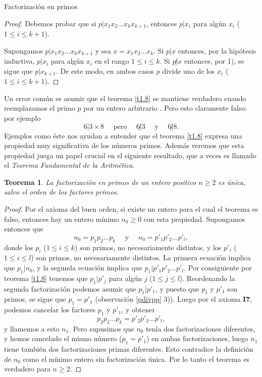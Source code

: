 \documentclass[11pt,spanish,makeidx]{amsbook}
\newtheorem{teorema}{Teorema}[section]
\theoremstyle{definition}
\theoremstyle{remark}
\begin{document}
\begin{section}{Factorización en primos}
\begin{proof}
Debemos probar que si $p|x_1x_2\ldots x_{k}x_{k+1}$, entonces  $p|x_i$ para algún $x_i$ ($1\le i \le k+1$).

Supongamos $p|x_1x_2\ldots x_{k}x_{k+1}$ y sea $x=x_1x_2\ldots x_k$. Si $p|x$ entonces, por la hipótesis inductiva, $p|x_i$ para algún $x_i$ en el rango $1\le i \le k$. Si $p{{\not|}}x$ entonces, por 1), se sigue que $p|x_{k+1}$. De este modo, en ambos casos $p$ divide uno de los $x_i$ ($1\le i\le k+1$). 
\end{proof}

Un error común es asumir que el teorema \ref{t1.8} se mantiene verdadero cuando reemplazamos el primo $p$ por un entero arbitrario . Pero esto claramente falso: por ejemplo
$$
6| 3\times 8 \quad \text{ pero } \quad 6{\not|} 3 \quad \text{ y }
\quad 6{\not|}8.
$$
Ejemplos como éste nos ayudan a entender que el teorema \ref{t1.8} expresa una propiedad muy significativa de los números primos. Además veremos que esta propiedad juega un papel crucial en el siguiente resultado, que a veces es llamado el {\it Teorema Fundamental de la Aritmética}.

\begin{teorema}\label{t1.8.2} La factorización en primos de un entero positivo $n\ge 2$ es única, salvo el orden de los factores primos.
\end{teorema}
\begin{proof} Por el axioma del buen orden, si existe un entero para el cual el teorema es falso, entonces hay un entero mínimo $n_0\ge 0$ con esta propiedad. Supongamos entonces que
$$
n_0= p_1p_2\ldots p_k\quad\text{ y }\quad n_0= p'_1p'_2\ldots p'_l,
$$
donde los $p_i$ ($1\le i \le k$) son primos, no necesariamente distintos, y los $p'_i$ ($1\le i \le l$) son primos, no necesariamente distintos. La primera ecuación implica que $p_1|n_0$, y la segunda ecuación implica que $p_1 | p'_1p'_2\ldots p'_l$. Por consiguiente por teorema \ref{t1.8} tenemos que $p_1|p'_j$ para algún $j$ ($1\le j \le l$). Reordenando la segunda factorización podemos asumir que $p_1 | p'_1$, y puesto que $p_1$ y $p'_1$ son primos, se sigue que $p_1=p'_1$ (observación \ref{pdivpp} 3)). Luego por el axioma {\bf I7}, podemos cancelar los factores $p_1$ y $p'_1$, y obtener
$$
p_2p_3 \ldots p_k = p'_2p'_3 \ldots p'_l,
$$
y llamemos a esto $n_1$. Pero supusimos que $n_0$ tenía dos factorizaciones diferentes, y hemos cancelado el mismo número ($p_1=p'_1$) en ambas factorizaciones, luego $n_1$ tiene también dos factorizaciones primas diferentes. Esto contradice la definición de $n_0$ como el mínimo entero sin factorización única. Por lo tanto el teorema es verdadero para $n\ge 2$.
\end{proof}


\end{section}
\end{document}

